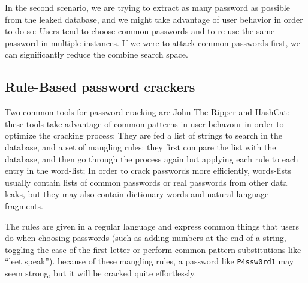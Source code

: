 In the second scenario, we are trying to extract as many password as possible from the leaked database, and we might take advantage of user behavior in order to do so: Users tend to choose common passwords and to re-use the same password in multiple instances. If we were to attack common passwords first, we can significantly reduce the combine search space.

\subsection{Rule-Based password crackers}

Two common tools for password cracking are John The Ripper and \break \mbox{HashCat}\cite{john,hash_cat}: these tools take advantage of common patterns in user behavour in order to optimize the cracking process: They are fed a list of strings to search in the database, and a set of mangling rules: they first compare the list with the database, and then go through the process again but applying each rule to each entry in the word-list; In order to crack passwords more efficiently, words-lists usually contain lists of common passwords or real passwords from other data leaks, but they may also contain dictionary words and natural language fragments.

The rules are given in a regular language and express common things that users do when choosing passwords (such as adding numbers at the end of a string, toggling the case of the first letter or perform common pattern substitutions like \enquote{leet speak}). because of these mangling rules, a password like \texttt{P4ssw0rd1} may seem strong, but it will be cracked quite effortlessly.
